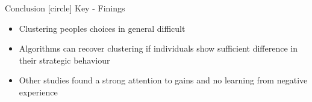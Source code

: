 \documentclass[11pt]{beamer}
\begin{document}
\begin{frame}{Conclusion}
	[circle]
	Key - Finings
	\begin{itemize}
		\item Clustering peoples choices in general difficult
		\item Algorithms can recover clustering if individuals show sufficient difference in their strategic behaviour
		\item Other studies found a strong attention to gains and no learning from negative experience
	\end{itemize}
	
\end{frame}
\end{document}

